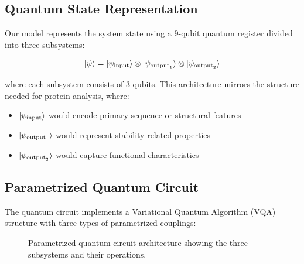 \documentclass[11pt,a4paper]{article}
\begin{document}
\subsection{Quantum State Representation}

Our model represents the system state using a 9-qubit quantum register divided into three subsystems:

\begin{equation}
\ket{\psi} = \ket{\psi_{\text{input}}} \otimes \ket{\psi_{\text{output}_1}} \otimes \ket{\psi_{\text{output}_2}}
\end{equation}

where each subsystem consists of 3 qubits. This architecture mirrors the structure needed for protein analysis, where:
\begin{itemize}
    \item $\ket{\psi_{\text{input}}}$ would encode primary sequence or structural features
    \item $\ket{\psi_{\text{output}_1}}$ would represent stability-related properties
    \item $\ket{\psi_{\text{output}_2}}$ would capture functional characteristics
\end{itemize}

\subsection{Parametrized Quantum Circuit}

The quantum circuit implements a Variational Quantum Algorithm (VQA) structure with three types of parametrized couplings:

\begin{figure}[h]
\centering
{}
\caption{Parametrized quantum circuit architecture showing the three subsystems and their operations.}
\label{fig:circuit}
\end{figure}
\end{document}

